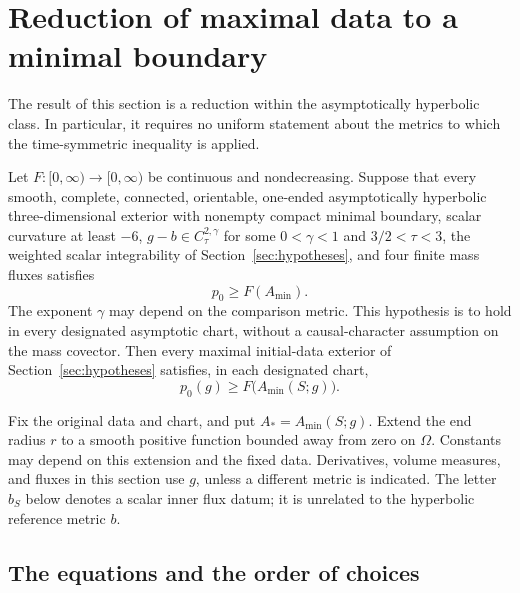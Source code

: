 \section{Reduction of maximal data to a minimal boundary}
\label{sec:maximal-reduction}

The result of this section is a reduction within the asymptotically
hyperbolic class.  In particular, it requires no uniform statement about
the metrics to which the time-symmetric inequality is applied.

\begin{theorem}\label{thm:ah-reduction}
Let \(F:[0,\infty)\to[0,\infty)\) be continuous and nondecreasing.
Suppose that every smooth, complete, connected, orientable, one-ended
asymptotically hyperbolic three-dimensional exterior with nonempty
compact minimal boundary, scalar curvature at least \(-6\),
\(g-b\in C^{2,\gamma}_\tau\) for some \(0<\gamma<1\) and
\(3/2<\tau<3\), the weighted scalar integrability of
Section~\ref{sec:hypotheses}, and four finite mass fluxes satisfies
\[
 p_0\ge F(A_{\min}).
\]
The exponent \(\gamma\) may depend on the comparison metric.
This hypothesis is to hold in every designated asymptotic chart,
without a causal-character assumption on the mass covector.
Then every maximal initial-data exterior of
Section~\ref{sec:hypotheses} satisfies, in each designated chart,
\[
 p_0(g)\ge F\bigl(A_{\min}(S;g)\bigr).
\]
\end{theorem}

Fix the original data and chart, and put \(A_*=A_{\min}(S;g)\).
Extend the end radius \(r\) to a smooth positive function bounded away
from zero on \(\Omega\).  Constants may depend on this extension and
the fixed data.  Derivatives, volume measures, and fluxes in this
section use \(g\), unless a different metric is indicated.
The letter \(b_S\) below denotes a scalar inner flux datum; it is
unrelated to the hyperbolic reference metric \(b\).

\subsection{The equations and the order of choices}

